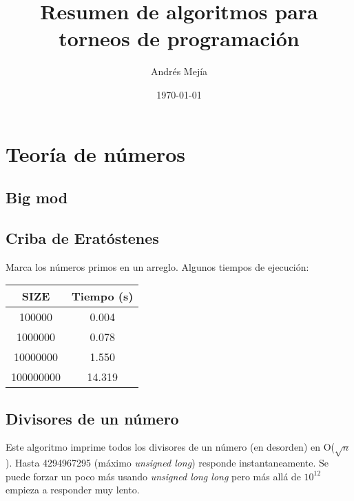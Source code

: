 \documentclass[10pt,letterpaper]{article}
\begin{document}
\title{Resumen de algoritmos para torneos de programación}
\author{Andrés Mejía}
\date{\today}

\tableofcontents
{}
\section{Teoría de números}
\subsection{Big mod}


\subsection{Criba de Eratóstenes}
Marca los números primos en un arreglo. Algunos tiempos de ejecución:
\begin{center}
\begin{tabular}{c c}
\hline\hline
SIZE & Tiempo (s) \\ [0.5ex]
\hline
100000 & 0.004 \\
1000000 & 0.078 \\
10000000 & 1.550 \\
100000000 & 14.319 \\ [1ex]
\hline
\end{tabular}
\end{center}


\subsection{Divisores de un número}
Este algoritmo imprime todos los divisores de un número (en desorden) en O($\sqrt{n}$).
Hasta 4294967295 (máximo \textit{unsigned long}) responde instantaneamente. Se puede
forzar un poco más usando \textit{unsigned long long} pero más allá de $10^{12}$ empieza a
responder muy lento.
\end{document}
